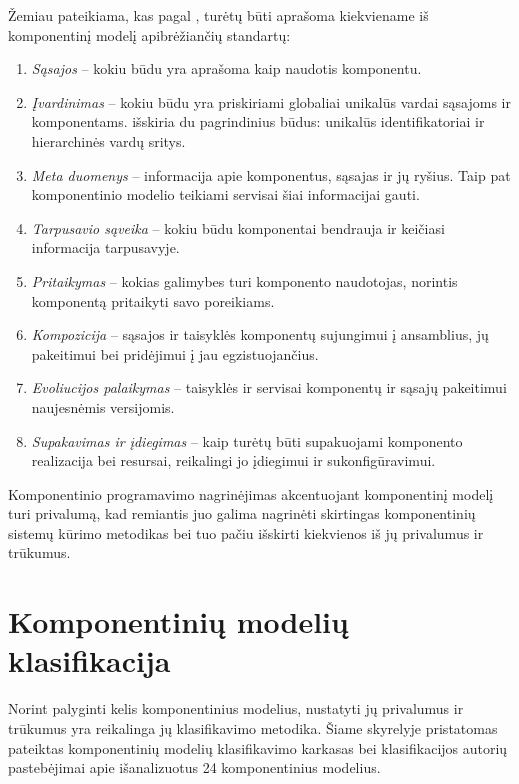 Žemiau pateikiama, kas pagal \cite[37]{heineman2001component}, turėtų
būti aprašoma kiekviename iš komponentinį modelį apibrėžiančių standartų:
\begin{enumerate}
  \item \emph{Sąsajos} – kokiu būdu yra aprašoma kaip naudotis
    komponentu.
  \item \emph{Įvardinimas} – kokiu būdu yra priskiriami globaliai
    unikalūs vardai sąsajoms ir komponentams.
    \cite[40]{heineman2001component} išskiria du pagrindinius būdus:
    unikalūs identifikatoriai ir hierarchinės vardų sritys.
  \item \emph{Meta duomenys} – informacija apie komponentus, sąsajas
    ir jų ryšius. Taip pat komponentinio modelio teikiami servisai
    šiai informacijai gauti.
  \item \emph{Tarpusavio sąveika} – kokiu būdu komponentai bendrauja
    ir keičiasi informacija tarpusavyje.
  \item \emph{Pritaikymas} – kokias galimybes turi komponento naudotojas,
    norintis komponentą pritaikyti savo poreikiams.
  \item \emph{Kompozicija} – sąsajos ir taisyklės komponentų
    sujungimui į ansamblius, jų pakeitimui bei pridėjimui į jau
    egzistuojančius.
  \item \emph{Evoliucijos palaikymas} – taisyklės ir servisai
    komponentų ir sąsajų pakeitimui naujesnėmis versijomis.
  \item \emph{Supakavimas ir įdiegimas} – kaip turėtų būti supakuojami
    komponento realizacija bei resursai, reikalingi jo įdiegimui
    ir sukonfigūravimui.
\end{enumerate}

Komponentinio programavimo nagrinėjimas akcentuojant komponentinį modelį
turi privalumą, kad remiantis juo galima nagrinėti skirtingas
komponentinių sistemų kūrimo metodikas bei tuo pačiu išskirti
kiekvienos iš jų privalumus ir trūkumus.

\section{Komponentinių modelių klasifikacija}

\label{section:component:model:classification}

Norint palyginti kelis komponentinius modelius, nustatyti jų privalumus
ir trūkumus yra reikalinga jų klasifikavimo metodika. Šiame skyrelyje
pristatomas \cite{classification-framework-for-scm} pateiktas
komponentinių modelių klasifikavimo karkasas bei klasifikacijos
autorių pastebėjimai apie išanalizuotus 24 komponentinius modelius.

